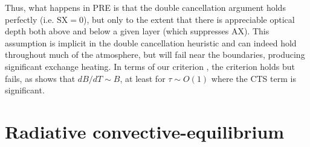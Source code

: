 \documentclass[10pt]{article}
\newcommand{\SX}{\ensuremath{\mathrm{SX}}}
\newcommand{\AX}{\ensuremath{\mathrm{AX}}}
\begin{document}
Thus, what happens in PRE is that the double cancellation argument holds perfectly (i.e. $\SX=0$), but only to the extent that there is appreciable optical depth both above and below a given layer (which suppresses \AX). This assumption is implicit in the double cancellation  heuristic and can indeed hold throughout much of the atmosphere, but will fail near the boundaries, producing significant exchange heating.  In terms of our criterion , the criterion  holds but   fails, as  shows that $dB/dT \sim B$, at least for $\tau \sim O(1)$ where the CTS term is significant.

\section{Radiative convective-equilibrium} \label{sec_rce}

\end{document}
